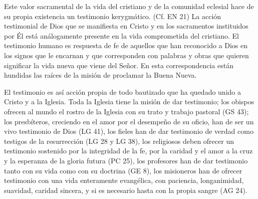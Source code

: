 Este valor sacramental de la vida del cristiano y de la comunidad eclesial hace de su propia existencia un testimonio kerygmático. (Cf. EN 21)
La acción testimonial de Dios que se manifiesta en Cristo y en los sacramentos instituidos por Él está análogamente presente en la vida comprometida del cristiano. El testimonio humano es respuesta de fe de aquellos que han reconocido a Dios en los signos que le encarnan y que corresponden con palabras y obras que quieren significar la vida nueva que viene del Señor. En esta correspondencia están hundidas las raíces de la misión de proclamar la Buena Nueva.

El testimonio es así acción propia de todo bautizado que ha quedado unido a Cristo y a la Iglesia\autocite[Cf.~][188]{prades2015testimonio}. Toda la Iglesia tiene la misión de dar testimonio; los obispos ofrecen al mundo el rostro de la Iglesia con su trato y trabajo pastoral (GS 43); los presbíteros, creciendo en el amor por el desempeño de su oficio, han de ser un vivo testimonio de Dios (LG 41), los fieles han de dar testimonio de verdad como testigos de la resurrección (LG 28 y LG 38), los religiosos deben ofrecer un testimonio sostenido por la integridad de la fe, por la caridad y el amor a la cruz y la esperanza de la gloria futura (PC 25), los profesores han de dar testimonio tanto con su vida como con su doctrina (GE 8), los misioneros han de ofrecer testimonio con una vida enteramente evangélica, con paciencia, longanimidad, suavidad, caridad sincera, y si es necesario hasta con la propia sangre (AG 24).

